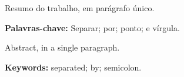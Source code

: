 \setlength{\absparsep}{18pt} %
\begin{resumo}[Resumo]
Resumo do trabalho, em parágrafo único.

\textbf{Palavras-chave:} Separar; por; ponto; e vírgula.

\end{resumo}

\setlength{\absparsep}{18pt} %
\begin{resumo}[Abstract]
Abstract, in a single paragraph.    

\textbf{Keywords:} separated; by; semicolon.
\end{resumo}



